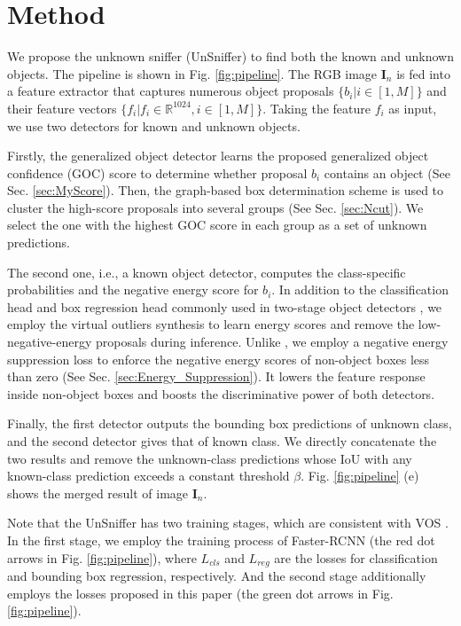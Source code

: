 \documentclass[10pt,twocolumn,letterpaper]{article}
\newcommand{\xf}[1]{{\color{black} #1}}
\begin{document}
\section{Method}
\label{sec:method}

We propose the unknown sniffer (UnSniffer) to find both the known and unknown objects.
The pipeline is shown in Fig. \ref{fig:pipeline}.
The RGB image $\mathbf{I}_n$
is fed into a feature extractor \cite{ren2015faster} that captures numerous object proposals $\{b_i|i\in[1,M]\}$ and their feature vectors $\{f_i|f_i\in\mathbb{R}^{1024},i\in[1,M]\}$.
Taking the feature $f_i$ as input,
we use two detectors for known and unknown objects. 

Firstly,
the generalized object detector learns the proposed generalized object confidence (GOC) score to determine whether proposal $b_i$ contains an object (See Sec. \ref{sec:MyScore}).
Then, the graph-based box determination scheme is used to cluster the high-score proposals into several groups (See Sec. \ref{sec:Ncut}).
We select the one with the highest GOC score in each group \xf{as} a set of unknown predictions.

The second one, i.e., a known object detector,
computes the class-specific probabilities
and the negative energy score \cite{vos} for $b_i$.
In addition to the classification head and box regression head commonly used in two-stage object detectors \cite{ren2015faster,he2017mask, lin2017feature,cai2018cascade},
we employ the virtual outliers synthesis \cite{vos} to learn energy scores
and remove the low-negative-energy proposals \xf{during} inference.
Unlike \cite{vos},
we employ a negative energy suppression loss to enforce the negative energy scores of non-object boxes less than zero (See Sec. \ref{sec:Energy_Suppression}).
It \xf{lowers} the feature response inside non-object boxes and boosts the discriminative power of both detectors.

Finally,
the first detector outputs the bounding box predictions of unknown class,
and the second detector gives that of known class.
We directly concatenate the two results and remove the unknown-class predictions whose IoU with any known-class prediction exceeds a constant threshold $\beta$.
Fig. \ref{fig:pipeline} (e) shows the merged result of image $\mathbf{I}_n$.

Note that the UnSniffer has two training stages,
which \xf{are} consistent with VOS \cite{vos}.
In the first stage,
we employ the training process of Faster-RCNN \cite{ren2015faster}
(the red dot arrows in Fig. \ref{fig:pipeline}),
where $L_{cls}$ and $L_{reg}$ are the losses for classification and bounding box regression, respectively.
And the second stage additionally employs the losses proposed in this paper (the green dot arrows in Fig. \ref{fig:pipeline}).
\end{document}
